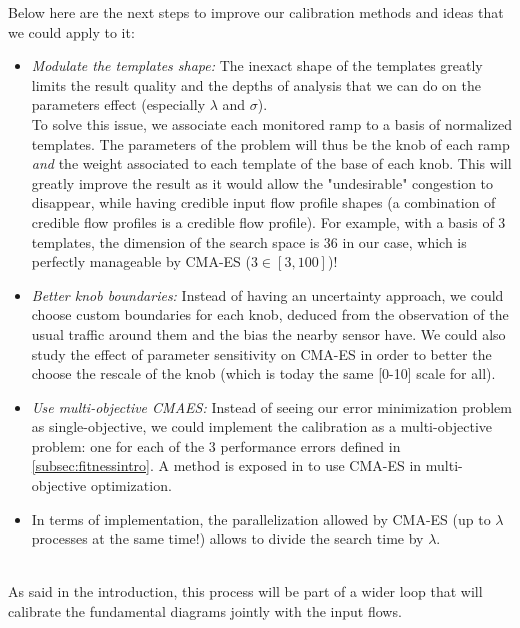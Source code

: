 Below here are the next steps to improve our calibration methods and ideas that we could apply to it: 

\begin{itemize}
\item \emph{Modulate the templates shape:} The inexact shape of the templates greatly limits the result quality and the depths of analysis that we can do on the parameters effect (especially $\lambda$ and $\sigma$).\\
To solve this issue, we associate each monitored ramp to a basis of normalized templates. The parameters of the problem will thus be the knob of each ramp \emph{and} the weight associated to each template of the base of each knob. This will greatly improve the result as it would allow the "undesirable" congestion to disappear, while having credible input flow profile shapes (a combination of credible flow profiles is a credible flow profile).
For example, with a basis of 3 templates, the dimension of the search space is $36$ in our case, which is perfectly manageable by CMA-ES ($3\in [3,100]$)!
\item \emph{Better knob boundaries:} Instead of having an uncertainty approach, we could choose custom boundaries for each knob, deduced from the observation of the usual traffic around them and the bias the nearby sensor have. We could also study the effect of parameter sensitivity on CMA-ES in order to better the choose the rescale of the knob (which is today the same [0-10] scale for all).
\item \emph{Use multi-objective CMAES:} Instead of seeing our error minimization problem as single-objective, we could implement the calibration as a multi-objective problem: one for each of the 3 performance errors defined in \ref{subsec:fitnessintro}. A method is exposed in \cite{mocmaes} to use CMA-ES in  multi-objective optimization.
\item In terms of implementation, the parallelization allowed by CMA-ES (up to $\lambda$ processes at the same time!) allows to divide the search time by $\lambda$.
\end{itemize}
~\\
As said in the introduction, this process will be part of a wider loop that will calibrate the fundamental diagrams jointly with the input flows.
